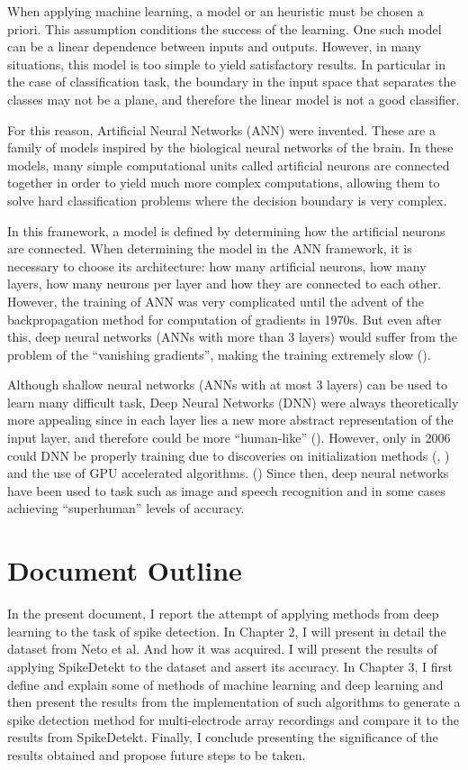 When applying machine learning, a model or an heuristic must be chosen a priori. This assumption conditions the success of the learning. One such model can be a linear dependence between inputs and outputs. However, in many situations, this model is too simple to yield satisfactory results. In particular in the case of classification task, the boundary in the input space that separates the  classes may not be a plane, and therefore the linear model is not a good classifier.

For this reason, Artificial Neural Networks (ANN) were invented. These are a family of models inspired by the biological neural networks of the brain. In these models, many simple computational units called artificial neurons are connected together in order to yield much more complex computations, allowing them to solve hard classification problems where the decision boundary is very complex.

In this framework, a model is defined by determining how the artificial neurons are connected. When determining the model in the ANN framework, it is necessary to choose its architecture: how many artificial neurons, how many layers, how many neurons per layer and how they are connected to each other. However, the training of ANN was very complicated until the advent of the backpropagation method for computation of gradients in 1970s.  But even after this, deep neural networks (ANNs with more than 3 layers) would suffer from the problem of the “vanishing gradients”, making the training extremely slow (\cite{hochreiter2001gradient}).

Although shallow neural networks (ANNs with at most 3 layers) can be used to learn many difficult task, Deep Neural Networks (DNN) were always theoretically more appealing since in each layer lies a new more abstract representation of the input layer, and therefore could be more “human-like” (\cite{rumelhart1988learning}). However, only in 2006 could DNN be properly training due to discoveries on initialization methods (\cite{hinton2006fast}, \cite{bengio2007greedy}) and the use of GPU accelerated algorithms. (\cite{raina2009large}) Since then, deep neural networks have been used to task such as image and speech recognition and in some cases achieving “superhuman” levels of accuracy.

\section{Document Outline}
In the present document, I report the attempt of applying methods from deep learning to the task of spike detection. In Chapter 2, I will present in detail the dataset from Neto et al. And how it was acquired. I will present the results of applying SpikeDetekt to the dataset and assert its accuracy. In Chapter 3, I first define and explain some of methods of machine learning and deep learning and then present the results from the implementation of such algorithms to generate a spike detection method for multi-electrode array recordings and compare it to the results from SpikeDetekt. Finally, I conclude presenting the significance of the results obtained and propose future steps to be taken.

